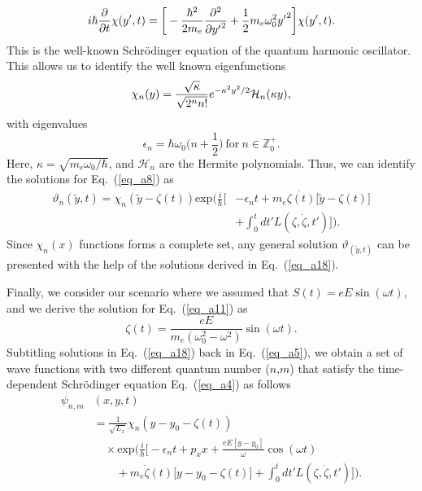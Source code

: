 \begin{equation} \label{eq_a15}
    i \hbar \pdv{t} \chi(y',t)  =
    \bigg[
        -  \frac{\hbar^2}{2m_e}\pdv[2]{{y'}}
        + \frac{1}{2} m_e \omega_0^2 {y'}^2
    \bigg] \chi(y',t).
\end{equation}
This is the well-known Schrödinger equation of the quantum harmonic oscillator.
This allows us to identify the well known eigenfunctions \cite{griffiths18,shankar94}
\begin{equation} \label{eq_a16}
  \chi_n(y) =
   \frac{\sqrt{\kappa}}{\sqrt{2^{n}n!}}
  e^{-\kappa^2 y^2/2}
  \mathcal{H}_n \qty(\kappa y),
\end{equation}
with eigenvalues
\begin{equation} \label{eq_a17}
  \epsilon_n = \hbar \omega_0 \bigg(n + \frac{1}{2}\bigg)
  ~\text{for}~
  n \in \mathbb{Z}^{+}_0.
\end{equation}
Here, $\kappa = \sqrt{{m_e \omega_0}/{\hbar}}$, and $\mathcal{H}_n$ are the Hermite polynomials.
Thus, we can identify the solutions for Eq.~(\ref{eq_a8}) as
\begin{equation} \label{eq_a18}
  \begin{aligned}
    \vartheta_n(\tilde{y},t) = \chi_n(\tilde{y} - \zeta(t))
     \text{exp}\bigg(\frac{i}{\hbar}\bigg[&- \epsilon_nt +
    m_e\dot{\zeta(t)}\big[\tilde{y}-\zeta(t)\big] \\
     & + \int_0^{t}dt'L(\zeta,\dot{\zeta},t')\bigg]\bigg).
  \end{aligned}
\end{equation}
Since $\chi_n(x)$ functions forms a complete set, any general solution $\vartheta_(\tilde{y},t)$ can be presented with the help of the solutions derived in Eq.~(\ref{eq_a18}).

Finally, we consider our scenario where we assumed that $S(t) = eE\sin(\omega t)$, and we derive the solution for Eq.~(\ref{eq_a11}) as
\begin{equation} \label{eq_a19}
  \zeta(t) = \frac{eE}{m_e(\omega_0^2 - \omega^2)}\sin(\omega t).
\end{equation}
Subtitling solutions in Eq.~(\ref{eq_a18}) back in Eq.~(\ref{eq_a5}), we obtain a set of wave functions with two different quantum number ($n$,$m$) that satisfy the time-dependent Schrödinger equation Eq.~(\ref{eq_a4}) as follows
\begin{equation} \label{eq_a20}
  \begin{aligned}
    \psi_{n,m}&(x,y,t) \\
    &=  \frac{1}{\sqrt{L_x}}
    \chi_n\left(y - y_0 - \zeta(t)\right)\\
    &\quad\times
    \text{exp}\bigg(
    \frac{i}{\hbar}\bigg[- \epsilon_nt
    + p_x x + \frac{eE[y - y_0]}{\omega}\cos(\omega t)\\
    & \quad\quad+
    m_e\dot{\zeta}(t)\big[y - y_0 -\zeta(t)\big] +
    \int_0^{t}dt'L(\zeta,\dot{\zeta},t')\bigg]\bigg).
  \end{aligned}
\end{equation}
